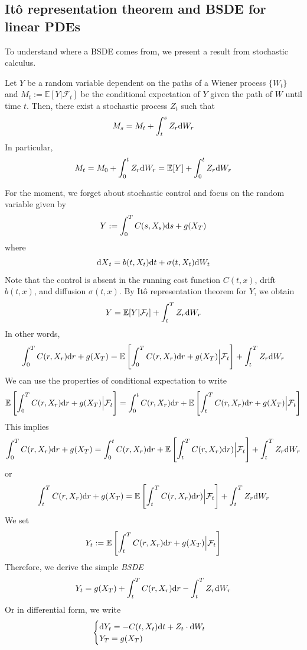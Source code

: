 \documentclass[11pt]{book}
\newcommand{\dd}{\text{\normalfont d}}
\newcommand{\dt}{\text{\normalfont d}t}
\newcommand{\ds}{\text{\normalfont d}s}
\newcommand{\dr}{\text{\normalfont d}r}
\newcommand{\dX}{\text{\normalfont d}X}
\newcommand{\dW}{\text{\normalfont d}W}
\begin{document}
\subsection{Itô representation theorem and BSDE for linear PDEs}
To understand where a BSDE comes from, we present a result  from stochastic calculus. 
\begin{thm}\label{thm:mg_rep}
    Let $Y$ be a random variable dependent on the paths of a Wiener process $\{W_t\}$ and $M_t:=\mathbb{E}[Y|\mathcal{F}_t]$ be the conditional expectation of $Y$ given the path of $W$ until time $t$. Then, there exist a stochastic process $Z_t$ such that
    \[
    M_s=M_t+\int_t^sZ_r\dW_r
    \]
    In particular,
    \[
    M_t=M_0+\int_0^tZ_r\dW_r=\mathbb{E}[Y]+\int_0^tZ_r\dW_r
    \]
\end{thm}
For the moment, we forget about stochastic control and focus on the random variable given by
\begin{equation}
Y:=\int_0^T C(s,X_s){{\ds}}+g(X_T)
\end{equation}
where
\[
{\dX}_t =b(t,X_t){\dt}+\sigma(t,X_t)\dW_t
\]
Note that the control is absent in the running cost function $C(t,x)$, drift $b(t,x)$, and diffusion $\sigma(t,x)$.
By Itô representation theorem for $Y$, we obtain
\[
Y=\mathbb{E}[Y|\mathcal{F}_t]+\int_t^T Z_r\dW_r
\]
In other words,
\[
\int_0^T C(r,X_r){{\dr}}+g(X_T) =  \mathbb{E}\left[\int_0^T C(r,X_r){{\dr}}+g(X_T)\Big|\mathcal{F}_t\right] + \int_t^TZ_r\dW_r
\]
We can use the properties of conditional expectation to write 
\[
\mathbb{E}\left[\int_0^T C(r,X_r){{\dr}}+g(X_T)\Big|\mathcal{F}_t\right] = \int_0^t C(r,X_r){{\dr}}+\mathbb{E}\left[\int_t^T C(r,X_r){{\dr}}+g(X_T)\Big|\mathcal{F}_t\right]
\]
This implies 
\[
\int_0^T C(r,X_r){{\dr}}+g(X_T) = \int_0^t C(r,X_r){{\dr}} + \mathbb{E}\left[\int_t^T C(r,X_r){{\dr}})\Big|\mathcal{F}_t\right] + \int_t^TZ_r\dW_r
\]
or
\[
\int_t^T C(r,X_r){{\dr}}+g(X_T) =  \mathbb{E}\left[\int_t^T C(r,X_r){{\dr}})\Big|\mathcal{F}_t\right] + \int_t^TZ_r\dW_r
\]
We set
\[
Y_t:=\mathbb{E}\left[\int_t^T C(r,X_r){{\dr}}+g(X_T)\Big|\mathcal{F}_t\right]
\]
Therefore, we derive the simple \emph{BSDE}
\[
Y_t = g(X_T) + \int_t^T C(r,X_r){{\dr}}  - \int_t^T Z_r\dW_r
\]
Or in differential form, we write
\begin{equation}
\label{eqn:BSDE_F-K}
    \begin{cases}
    \dd Y_t =  - C(t,X_t){\dt} + Z_t\cdot\dW_t\\
    Y_T=g(X_T)
\end{cases}
\end{equation}
\end{document}
